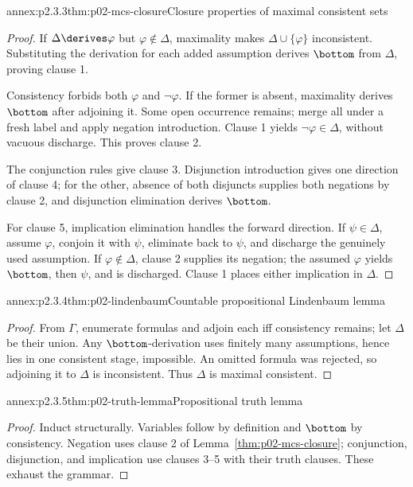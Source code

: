 \begin{annexitem}{annex:p2.3.3}{thm:p02-mcs-closure}{Closure properties of maximal consistent sets}
\begin{proof}
If \(\Delta\derives\varphi\) but \(\varphi\notin\Delta\), maximality makes
\(\Delta\cup\{\varphi\}\) inconsistent.  Substituting the derivation for
each added assumption derives \(\bottom\) from \(\Delta\), proving clause 1.

Consistency forbids both \(\varphi\) and \(\neg\varphi\).  If the former is
absent, maximality derives \(\bottom\) after adjoining it.  Some open
occurrence remains; merge all under a fresh label and apply negation
introduction.  Clause 1 yields \(\neg\varphi\in\Delta\), without vacuous
discharge.  This proves clause 2.

The conjunction rules give clause 3.  Disjunction introduction gives one
direction of clause 4; for the other, absence of both disjuncts supplies both
negations by clause 2, and disjunction elimination derives \(\bottom\).

For clause 5, implication elimination handles the forward direction.  If
\(\psi\in\Delta\), assume \(\varphi\), conjoin it with \(\psi\), eliminate
back to \(\psi\), and discharge the genuinely used assumption.  If
\(\varphi\notin\Delta\), clause 2 supplies its negation; the assumed
\(\varphi\) yields \(\bottom\), then \(\psi\), and is discharged.  Clause 1
places either implication in \(\Delta\).
\end{proof}
\end{annexitem}

\begin{annexitem}{annex:p2.3.4}{thm:p02-lindenbaum}{Countable propositional Lindenbaum lemma}
\begin{proof}
From \(\Gamma\), enumerate formulas and adjoin each iff consistency remains;
let \(\Delta\) be their union.  Any \(\bottom\)-derivation uses finitely many
assumptions, hence lies in one consistent stage, impossible.  An omitted
formula was rejected, so adjoining it to \(\Delta\) is inconsistent.  Thus
\(\Delta\) is maximal consistent.
\end{proof}
\end{annexitem}

\begin{annexitem}{annex:p2.3.5}{thm:p02-truth-lemma}{Propositional truth lemma}
\begin{proof}
Induct structurally.  Variables follow by definition and \(\bottom\) by
consistency.  Negation uses clause 2 of Lemma~\ref{thm:p02-mcs-closure};
conjunction, disjunction, and implication use clauses 3--5 with their truth
clauses.  These exhaust the grammar.
\end{proof}
\end{annexitem}

